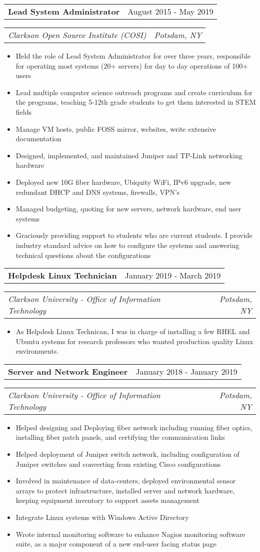 \documentclass[letterpaper,12pt]{article}
\makeatletter
\newcommand{\resitem}[1]{\item #1 \vspace{-3pt}}
\newcommand{\topheading}[2]{
\begin{tabular*}{6.5in}{l@{\extracolsep{\fill}}r}
		\textbf{#1} & #2 \\
\end{tabular*}}
\newcommand{\bottomheading}[2]{
\begin{tabular*}{6.5in}{l@{\extracolsep{\fill}}r}
		\textit{#1} & \textit{#2} \\
\end{tabular*}\vspace{-6pt}}
\makeatother
\begin{document}
\begin{itemize}
	\topheading{Lead System Administrator}{August 2015 - May 2019}
	\bottomheading{Clarkson Open Source Institute (COSI)}{Potsdam, NY}
	\begin{itemize}
		\resitem{Held the role of Lead System Administrator for over three years, responsible for operating most systems (20+ servers) for day to day operations of 100+ users}
    \resitem{Lead multiple computer science outreach programs and create curriculum for the programs, teaching 5-12th grade students to get them interested in STEM fields}
    \resitem{Manage VM hosts, public FOSS mirror, websites, write extensive documentation}
    \resitem{Designed, implemented, and maintained Juniper and TP-Link networking hardware}
    \resitem{Deployed new 10G fiber hardware, Ubiquity WiFi, IPv6 upgrade, new redundant DHCP and DNS systems, firewalls, VPN's}
		\resitem{Managed budgeting, quoting for new servers, network hardware, end user systems}
		\resitem{Graciously providing support to students who are current students. I provide industry standard advice on how to configure the systems and answering technical questions about the configurations}
	\end{itemize}

	\newpage

	\topheading{Helpdesk Linux Technician}{January 2019 - March 2019}
	\bottomheading{Clarkson University - Office of Information Technology}{Potsdam, NY}
	\begin{itemize}
		\resitem{As Helpdesk Linux Technican, I was in charge of installing a few RHEL and Ubuntu systems for research professors who wanted production quality Linux environments.}
	\end{itemize}

	\topheading{Server and Network Engineer}{January 2018 - January 2019}
	\bottomheading{Clarkson University - Office of Information Technology}{Potsdam, NY}
	\begin{itemize}
    \resitem{Helped designing and Deploying fiber network including running fiber optics, installing fiber patch panels, and certifying the communication links}
    \resitem{Helped deployment of Juniper switch network, including configuration of Juniper switches and converting from existing Cisco configurations}
    \resitem{Involved in maintenance of data-centers, deployed environmental sensor arrays to protect infrastructure, installed server and network hardware, keeping equipment inventory to support assets management}
		\resitem{Integrate Linux systems with Windows Active Directory}
    \resitem{Wrote internal monitoring software to enhance Nagios monitoring software suite, as a major component of a new end-user facing status page}
	\end{itemize}


\end{itemize}
\end{document}
